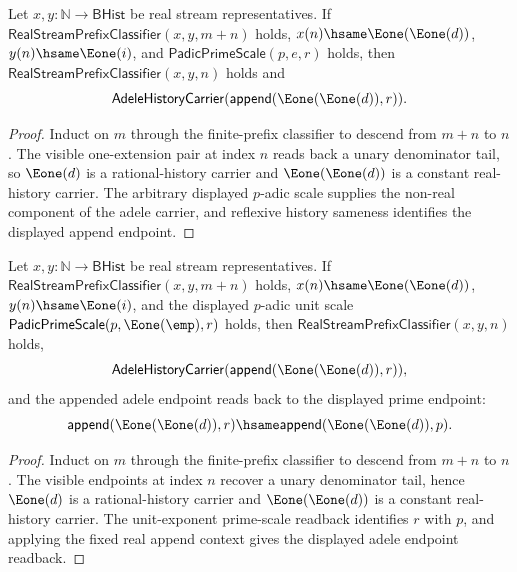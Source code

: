 \begin{theorem}
\label{thm:adele-real-stream-prefix-long-prefix-visible-padic-scale-carrier}
Let $x,y:\mathbb{N}\to\mathsf{BHist}$ be real stream representatives. If
$\mathsf{RealStreamPrefixClassifier}(x,y,m+n)$ holds, $x(n)\hsame
\Eone(\Eone(d))$, $y(n)\hsame\Eone(i)$, and
$\mathsf{PadicPrimeScale}(p,e,r)$ holds, then
$\mathsf{RealStreamPrefixClassifier}(x,y,n)$ holds and
$$
\mathsf{AdeleHistoryCarrier}(\mathsf{append}(\Eone(\Eone(d)),r)).
$$
\end{theorem}
\begin{proof}
Induct on $m$ through the finite-prefix classifier to descend from $m+n$ to
$n$. The visible one-extension pair at index $n$ reads back a unary denominator
tail, so $\Eone(d)$ is a rational-history carrier and $\Eone(\Eone(d))$ is a
constant real-history carrier. The arbitrary displayed $p$-adic scale supplies
the non-real component of the adele carrier, and reflexive history sameness
identifies the displayed append endpoint.
\end{proof}

\begin{theorem}
\label{thm:adele-long-prefix-visible-unit-scale-readback}
Let $x,y:\mathbb{N}\to\mathsf{BHist}$ be real stream representatives. If
$\mathsf{RealStreamPrefixClassifier}(x,y,m+n)$ holds, $x(n)\hsame
\Eone(\Eone(d))$, $y(n)\hsame\Eone(i)$, and the displayed $p$-adic unit scale
$\mathsf{PadicPrimeScale}(p,\Eone(\emp),r)$ holds, then
$\mathsf{RealStreamPrefixClassifier}(x,y,n)$ holds,
$$
\mathsf{AdeleHistoryCarrier}(\mathsf{append}(\Eone(\Eone(d)),r)),
$$
and the appended adele endpoint reads back to the displayed prime endpoint:
$$
\mathsf{append}(\Eone(\Eone(d)),r)
\hsame
\mathsf{append}(\Eone(\Eone(d)),p).
$$
\end{theorem}
\begin{proof}
Induct on $m$ through the finite-prefix classifier to descend from $m+n$ to
$n$. The visible endpoints at index $n$ recover a unary denominator tail, hence
$\Eone(d)$ is a rational-history carrier and $\Eone(\Eone(d))$ is a constant
real-history carrier. The unit-exponent prime-scale readback identifies
$r$ with $p$, and applying the fixed real append context gives the displayed
adele endpoint readback.
\end{proof}

